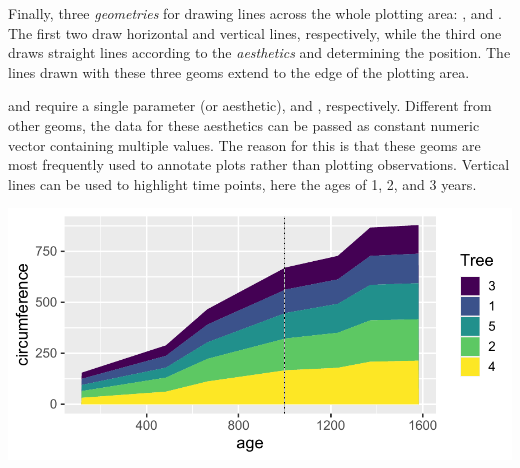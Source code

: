\documentclass[krantz2]{krantz}\usepackage{knitr}
\begin{document}

Finally,\label{sec:plot:vhline} three \emph{geometries} for drawing lines across the whole plotting area: ,  and . The first two draw horizontal and vertical lines, respectively, while the third one draws straight lines according to the \emph{aesthetics}  and  determining the position. The lines drawn with these three geoms extend to the edge of the plotting area.

 and  require a single parameter (or aesthetic),  and , respectively. Different from other geoms, the data for these aesthetics can be passed as constant numeric vector containing multiple values. The reason for this is that these geoms are most frequently used to annotate plots rather than plotting observations. Vertical lines can be used to highlight time points, here the ages of 1, 2, and 3 years.

\begin{knitrout}\footnotesize
{}\color{fgcolor}\begin{kframe}
\begin{alltt}
 \hlopt{+}
  \hlstd{(} \hlstd{=}  \hlopt{*} \hlopt{:}\hlstd{,}  \hlstd{=} \hlstd{)} \hlopt{+}
  \hlstd{(} \hlstd{=}  \hlopt{*} \hlopt{:}\hlstd{,}  \hlstd{=} \hlstd{)}
\end{alltt}
\end{kframe}

{\centering \includegraphics[width=.7\textwidth]{figure/pos-area-plot-02-1} 

}


\end{knitrout}
\end{document}
